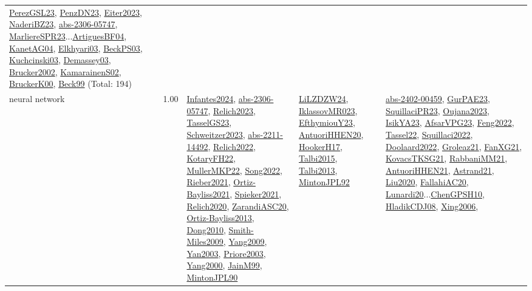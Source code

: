 {\begin{longtable}{p{3cm}r>{\raggedright\arraybackslash}p{6cm}>{\raggedright\arraybackslash}p{6cm}>{\raggedright\arraybackslash}p{8cm}}
\hyperref[detail:PerezGSL23]{PerezGSL23}, \hyperref[detail:PenzDN23]{PenzDN23}, \hyperref[detail:Eiter2023]{Eiter2023}, \hyperref[detail:NaderiBZ23]{NaderiBZ23}, \hyperref[detail:abs-2306-05747]{abs-2306-05747}, \hyperref[detail:MarliereSPR23]{MarliereSPR23}...\hyperref[detail:ArtiguesBF04]{ArtiguesBF04}, \hyperref[detail:KanetAG04]{KanetAG04}, \hyperref[detail:Elkhyari03]{Elkhyari03}, \hyperref[detail:BeckPS03]{BeckPS03}, \hyperref[detail:Kuchcinski03]{Kuchcinski03}, \hyperref[detail:Demassey03]{Demassey03}, \hyperref[detail:Brucker2002]{Brucker2002}, \hyperref[detail:KamarainenS02]{KamarainenS02}, \hyperref[detail:BruckerK00]{BruckerK00}, \hyperref[detail:Beck99]{Beck99} (Total: 194)\\
\index{neural network}\index{Algorithms!neural network}neural network &  1.00 & \hyperref[detail:Infantes2024]{Infantes2024}, \hyperref[detail:abs-2306-05747]{abs-2306-05747}, \hyperref[detail:Relich2023]{Relich2023}, \hyperref[detail:TasselGS23]{TasselGS23}, \hyperref[detail:Schweitzer2023]{Schweitzer2023}, \hyperref[detail:abs-2211-14492]{abs-2211-14492}, \hyperref[detail:Relich2022]{Relich2022}, \hyperref[detail:KotaryFH22]{KotaryFH22}, \hyperref[detail:MullerMKP22]{MullerMKP22}, \hyperref[detail:Song2022]{Song2022}, \hyperref[detail:Rieber2021]{Rieber2021}, \hyperref[detail:Ortiz-Bayliss2021]{Ortiz-Bayliss2021}, \hyperref[detail:Spieker2021]{Spieker2021}, \hyperref[detail:Relich2020]{Relich2020}, \hyperref[detail:ZarandiASC20]{ZarandiASC20}, \hyperref[detail:Ortiz-Bayliss2013]{Ortiz-Bayliss2013}, \hyperref[detail:Dong2010]{Dong2010}, \hyperref[detail:Smith-Miles2009]{Smith-Miles2009}, \hyperref[detail:Yang2009]{Yang2009}, \hyperref[detail:Yan2003]{Yan2003}, \hyperref[detail:Priore2003]{Priore2003}, \hyperref[detail:Yang2000]{Yang2000}, \hyperref[detail:JainM99]{JainM99}, \hyperref[detail:MintonJPL90]{MintonJPL90} & \hyperref[detail:LiLZDZW24]{LiLZDZW24}, \hyperref[detail:IklassovMR023]{IklassovMR023}, \hyperref[detail:EfthymiouY23]{EfthymiouY23}, \hyperref[detail:AntuoriHHEN20]{AntuoriHHEN20}, \hyperref[detail:HookerH17]{HookerH17}, \hyperref[detail:Talbi2015]{Talbi2015}, \hyperref[detail:Talbi2013]{Talbi2013}, \hyperref[detail:MintonJPL92]{MintonJPL92} & \hyperref[detail:abs-2402-00459]{abs-2402-00459}, \hyperref[detail:GurPAE23]{GurPAE23}, \hyperref[detail:SquillaciPR23]{SquillaciPR23}, \hyperref[detail:Oujana2023]{Oujana2023}, \hyperref[detail:IsikYA23]{IsikYA23}, \hyperref[detail:AfsarVPG23]{AfsarVPG23}, \hyperref[detail:Feng2022]{Feng2022}, \hyperref[detail:Tassel22]{Tassel22}, \hyperref[detail:Squillaci2022]{Squillaci2022}, \hyperref[detail:Doolaard2022]{Doolaard2022}, \hyperref[detail:Groleaz21]{Groleaz21}, \hyperref[detail:FanXG21]{FanXG21}, \hyperref[detail:KovacsTKSG21]{KovacsTKSG21}, \hyperref[detail:RabbaniMM21]{RabbaniMM21}, \hyperref[detail:AntuoriHHEN21]{AntuoriHHEN21}, \hyperref[detail:Astrand21]{Astrand21}, \hyperref[detail:Liu2020]{Liu2020}, \hyperref[detail:FallahiAC20]{FallahiAC20}, \hyperref[detail:Lunardi20]{Lunardi20}...\hyperref[detail:ChenGPSH10]{ChenGPSH10}, \hyperref[detail:HladikCDJ08]{HladikCDJ08}, \hyperref[detail:Xing2006]{Xing2006}, 
\end{longtable}}

